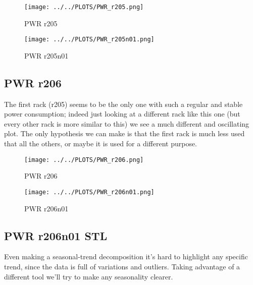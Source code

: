 \vspace{-15pt}

\begin{figure}[H]
\centering
\texttt{[image: ../../PLOTS/PWR\_r205.png]}
\captionsetup{skip=-10pt}
\caption{PWR r205}
\label{fig:PWR_r205}
\end{figure}

\vspace{-20pt}

\begin{figure}[H]
\centering
\texttt{[image: ../../PLOTS/PWR\_r205n01.png]}
\captionsetup{skip=-10pt}
\caption{PWR r205n01}
\label{fig:PWR_r205n01}
\end{figure}

\subsection{PWR r206}
The first rack (r205) seems to be the only one with such a regular and stable power consumption; indeed just looking at a different rack like this one (but every other rack is more similar to this) we see a much different and oscillating plot. The only hypothesis we can make is that the first rack is much less used that all the others, or maybe it is used for a different purpose.

\vspace{-12pt}

\begin{figure}[H]
\centering
\texttt{[image: ../../PLOTS/PWR\_r206.png]}
\captionsetup{skip=-10pt}
\caption{PWR r206}
\label{fig:PWR_r206}
\end{figure}

\vspace{-20pt}

\begin{figure}[H]
\centering
\texttt{[image: ../../PLOTS/PWR\_r206n01.png]}
\captionsetup{skip=-10pt}
\caption{PWR r206n01}
\label{fig:PWR_r206n01}
\end{figure}

\subsection{PWR r206n01 STL}
Even making a seasonal-trend decomposition it’s hard to highlight any specific trend, since the data is full of variations and outliers. Taking advantage of a different tool we’ll try to make any seasonality clearer.

